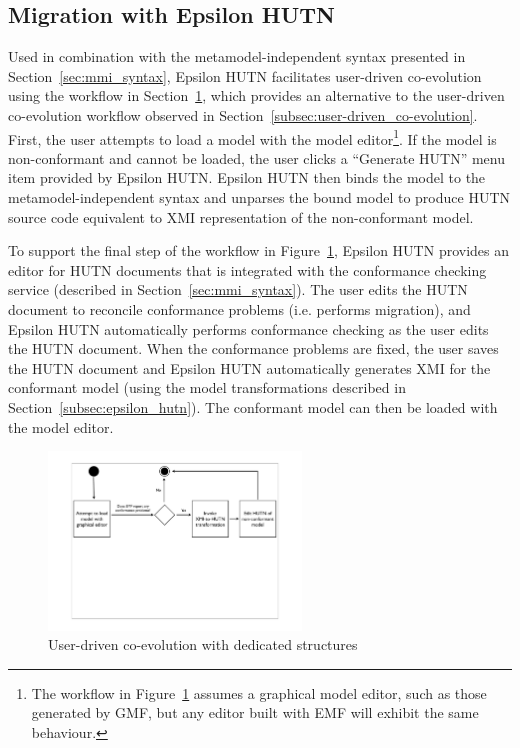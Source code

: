 \subsection{Migration with Epsilon HUTN}
\label{subsec:migration_with_hutn}
Used in combination with the metamodel-independent syntax presented in Section~\ref{sec:mmi_syntax}, Epsilon HUTN facilitates user-driven co-evolution using the workflow in Section~\ref{fig:hutn_process_implementation}, which provides an alternative to the user-driven co-evolution workflow observed in Section~\ref{subsec:user-driven_co-evolution}. First, the user attempts to load a model with the model editor\footnote{The workflow in Figure~\ref{fig:hutn_process_implementation} assumes a graphical model editor, such as those generated by GMF, but any editor built with EMF will exhibit the same behaviour.}. If the model is non-conformant and cannot be loaded, the user clicks a ``Generate HUTN'' menu item provided by Epsilon HUTN. Epsilon HUTN then binds the model to the metamodel-independent syntax and unparses the bound model to produce HUTN source code equivalent to XMI representation of the non-conformant model.

To support the final step of the workflow in Figure~\ref{fig:hutn_process_implementation}, Epsilon HUTN provides an editor for HUTN documents that is integrated with the conformance checking service (described in Section~\ref{sec:mmi_syntax}). The user edits the HUTN document to reconcile conformance problems (i.e. performs migration), and Epsilon HUTN automatically performs conformance checking as the user edits the HUTN document. When the conformance problems are fixed, the user saves the HUTN document and Epsilon HUTN automatically generates XMI for the conformant model (using the model transformations described in Section~\ref{subsec:epsilon_hutn}). The conformant model can then be loaded with the model editor.

\begin{figure}[htbp]
	\centering
	\includegraphics*[viewport=80 290 760 550,height=4.75cm]{6.Evaluation/images/user_driven/hutn_process.pdf}
	\caption{User-driven co-evolution with dedicated structures}
	\label{fig:hutn_process_implementation}
\end{figure}

